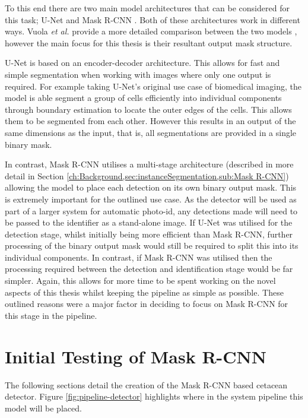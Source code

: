 To this end there are two main model architectures that can be considered for this task; U-Net \cite{ronneberger_u-net_2015} and Mask R-CNN \cite{he_mask_2017}. Both of these architectures work in different ways. Vuola \textit{et al.} provide a more detailed comparison between the two models \cite{vuola_mask-rcnn_2019}, however the main focus for this thesis is their resultant output mask structure. 

U-Net is based on an encoder-decoder architecture. This allows for fast and simple segmentation when working with images where only one output is required. For example taking U-Net's original use case of biomedical imaging, the model is able segment a group of cells efficiently into individual components through boundary estimation to locate the outer edges of the cells. This allows them to be segmented from each other. However this results in an output of the same dimensions as the input, that is, all segmentations are provided in a single binary mask. 

In contrast, Mask R-CNN utilises a multi-stage architecture (described in more detail in Section \ref{ch:Background,sec:instanceSegmentation,sub:Mask R-CNN}) allowing the model to place each detection on its own binary output mask. This is extremely important for the outlined use case. As the detector will be used as part of a larger system for automatic photo-id, any detections made will need to be passed to the identifier as a stand-alone image. If U-Net was utilised for the detection stage, whilst initially being more efficient than Mask R-CNN, further processing of the binary output mask would still be required to split this into its individual components. In contrast, if Mask R-CNN was utilised then the processing required between the detection and identification stage would be far simpler. Again, this allows for more time to be spent working on the novel aspects of this thesis whilst keeping the pipeline as simple as possible. These outlined reasons were a major factor in deciding to focus on Mask R-CNN for this stage in the pipeline.

\section{Initial Testing of Mask R-CNN}\label{ch:cetDet,sec:initialTesting}

The following sections detail the creation of the Mask R-CNN based cetacean detector. Figure \ref{fig:pipeline-detector} highlights where in the system pipeline this model will be placed.

